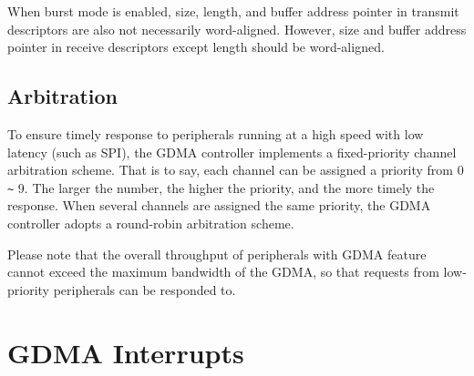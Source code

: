 \documentclass[main\_\_EN.tex]{subfiles}
\begin{document}
When burst mode is enabled, size, length, and buffer address pointer in transmit descriptors are also not necessarily word-aligned. However, size and buffer address pointer in receive descriptors except length should be word-aligned.

\subsection{Arbitration}

To ensure timely response to peripherals running at a high speed with low latency (such as SPI), the GDMA controller implements a fixed-priority channel arbitration scheme. That is to say, each channel can be assigned a priority from 0 \verb+~+ 9. The larger the number, the higher the priority, and the more timely the response. When several channels are assigned the same priority, the GDMA controller adopts a round-robin arbitration scheme.

Please note that the overall throughput of peripherals with GDMA feature cannot exceed the maximum bandwidth of the GDMA, so that requests from low-priority peripherals can be responded to.


\section{GDMA Interrupts}
\end{document}
